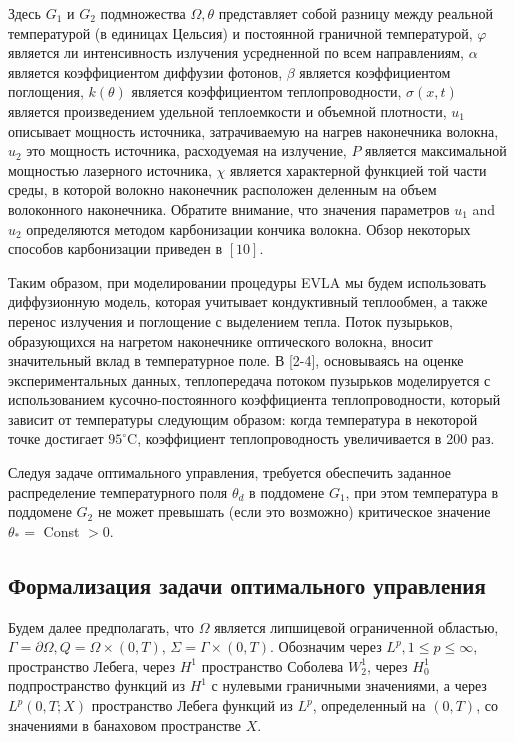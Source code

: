 Здесь $G_{1}$ и $G_{2}$ подмножества $\Omega, \theta$
представляет собой разницу между реальной температурой
(в единицах Цельсия) и постоянной граничной температурой,
$\varphi$ является ли интенсивность излучения усредненной по всем направлениям, $\alpha$
является коэффициентом диффузии фотонов, $\beta$ является коэффициентом поглощения,
$k(\theta)$ является коэффициентом теплопроводности, $\sigma(x, t)$
является произведением удельной теплоемкости и объемной плотности, $u_{1}$
описывает мощность источника, затрачиваемую на нагрев наконечника волокна, $u_{2}$
это мощность источника, расходуемая на излучение,
$P$ является максимальной мощностью лазерного источника, $\chi$
является характерной функцией той части среды, в которой волокно
наконечник расположен деленным на объем волоконного наконечника.
Обратите внимание, что значения параметров $u_{1}$ and $u_{2}$
определяются методом карбонизации кончика волокна.
Обзор некоторых способов карбонизации приведен в $[10]$.

Таким образом, при моделировании процедуры EVLA мы будем использовать диффузионную модель,
которая учитывает кондуктивный теплообмен, а также перенос излучения и поглощение с выделением тепла.
Поток пузырьков, образующихся на нагретом наконечнике оптического волокна, вносит значительный
вклад в температурное поле. В [2-4], основываясь на оценке экспериментальных данных,
теплопередача потоком пузырьков моделируется с использованием кусочно-постоянного
коэффициента теплопроводности, который зависит от температуры следующим образом:
когда температура в некоторой точке достигает $95 ^ {\circ} \mathrm{C}$,
коэффициент теплопроводность увеличивается в 200 раз.

Следуя задаче оптимального управления, требуется обеспечить заданное распределение
температурного поля $\theta_{d}$ в поддомене $G_{1}$,
при этом температура в поддомене $G_{2}$ не может превышать
(если это возможно) критическое значение $\theta_{*}=$ Const $>0$.

\subsection{Формализация задачи оптимального управления}
\label{subsec:ch3:sec2:subsec2}

Будем далее предполагать, что $\Omega$ является липшицевой ограниченной областью,
$\Gamma=\partial \Omega, Q=\Omega \times(0, T)$, $\Sigma=\Gamma \times(0, T)$.
Обозначим через $L^{p}, 1 \leq p \leq \infty$, пространство Лебега,
через $H^{1}$ пространство Соболева $W_{2}^{1}$,
через $H_{ 0}^{1}$ подпространство функций из $H^{1}$ с нулевыми граничными значениями,
а через $L^{p}(0, T ; X)$ пространство Лебега функций из $L^{ p}$,
определенный на $(0, T)$, со значениями в банаховом пространстве $X$.

